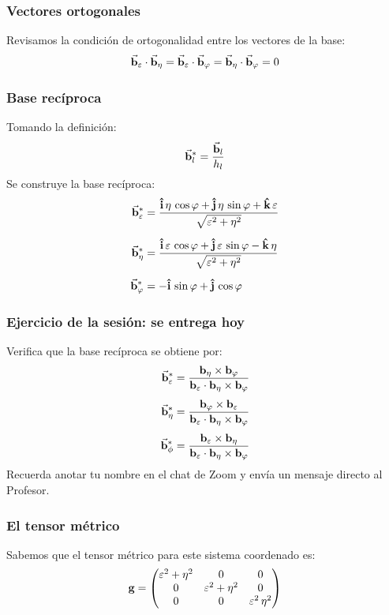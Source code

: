 \documentclass[12pt]{beamer}
\begin{document}
\begin{frame}
\frametitle{Vectores ortogonales}
Revisamos la condición de ortogonalidad entre los vectores de la base:
\pause
\begin{align}
\va{b}_{\varepsilon} \cdot \va{b}_{\eta} = \va{b}_{\varepsilon} \cdot \va{b}_{\varphi} = \va{b}_{\eta} \cdot \va{b}_{\varphi} = 0
\label{eq:ecuacion_01_20}
\end{align}
\end{frame}
\begin{frame}
\frametitle{Base recíproca}
Tomando la definición:
\pause
\begin{align*}
\va{b}_{l}^{*} = \dfrac{\va{b}_{l}}{h_{l}}
\end{align*}
\pause
Se construye la base recíproca:
\pause
\begin{align}
\begin{aligned}
\va{b}_{\varepsilon}^{*} &= \dfrac{\vu{i} \, \eta \, \cos \varphi + \vu{j} \, \eta \, \sin \varphi + \vu{k} \, \varepsilon}{\sqrt{\varepsilon^{2} + \eta^{2}}} \\[0.5em]
\va{b}_{\eta}^{*} &= \dfrac{\vu{i} \, \varepsilon \, \cos \varphi + \vu{j} \, \varepsilon \, \sin \varphi - \vu{k} \, \eta}{\sqrt{\varepsilon^{2} + \eta^{2}}} \\[0.5em]
\va{b}_{\varphi}^{*} &= - \vu{i} \, \sin \varphi + \vu{j} \, \cos \varphi
\end{aligned}
\label{eq:ecuacion_01_21}
\end{align}
\end{frame}
\begin{frame}
\frametitle{\textbf{Ejercicio de la sesión: se entrega hoy}}
Verifica que la base recíproca se obtiene por:
\begin{align*}
\va{b}_{\varepsilon}^{*} &= \dfrac{\vb{b}_{\eta} \times \vb{b}_{\varphi}}{\vb{b}_{\varepsilon} \cdot \vb{b}_{\eta} \times \vb{b}_{\varphi}} \\[0.35em]
\va{b}_{\eta}^{*} &= \dfrac{\vb{b}_{\varphi} \times \vb{b}_{\varepsilon}}{\vb{b}_{\varepsilon} \cdot \vb{b}_{\eta} \times \vb{b}_{\varphi}} \\[0.35em]
\va{b}_{\phi}^{*} &= \dfrac{\vb{b}_{\varepsilon} \times \vb{b}_{\eta}}{\vb{b}_{\varepsilon} \cdot \vb{b}_{\eta} \times \vb{b}_{\varphi}}
\end{align*}
Recuerda anotar tu nombre en el chat de Zoom y envía un  mensaje directo al Profesor.
\end{frame}
\begin{frame}
\frametitle{El tensor métrico}
Sabemos que el tensor métrico para este sistema coordenado es:
\begin{align}
\vb{g} = \mqty(
\varepsilon^{2} + \eta^{2} & 0 &  0 \\
0 & \varepsilon^{2} + \eta^{2} &  0 \\
0 & 0 & \varepsilon^{2} \, \eta^{2} )
\label{eq:ecuacion_01_22}
\end{align}
\end{frame}
\end{document}
